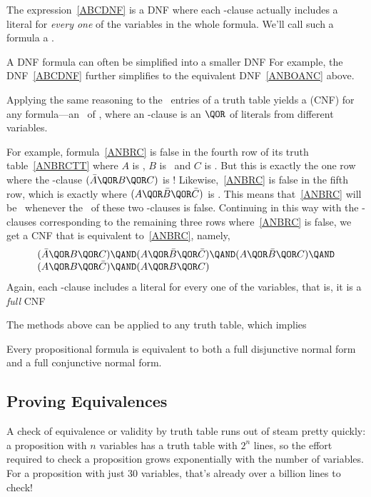 The expression~\eqref{ABCDNF} is a DNF where each \QAND-clause
actually includes a literal for \emph{every one} of the variables in
the whole formula.  We'll call such a formula a . 

A DNF formula can often be simplified into a smaller DNF For example,
the DNF~\eqref{ABCDNF} further simplifies to the equivalent
DNF~\eqref{ANBOANC} above.

Applying the same reasoning to the \false\ entries of a truth table
yields a  (CNF)
 for any formula---an
\QAND\ of , where an \QOR-clause is an $\QOR$ of
literals from different variables.

For example, formula~\eqref{ANBRC} is false in the fourth row of its
truth table~\eqref{ANBRCTT} where $A$ is \true, $B$ is \false\ and $C$
is \false.  But this is exactly the one row where the \QOR-clause
$(\bar{A} \QOR B \QOR C)$ is \false!  Likewise,~\eqref{ANBRC} is
false in the fifth row, which is exactly where $(A \QOR \bar{B} \QOR
\bar{C})$ is \false.  This means that~\eqref{ANBRC} will be
\false\ whenever the \QAND\ of these two \QOR-clauses is false.
\iffalse $(\bar{A} \QOR B \QOR C) \QAND (A \QOR \bar{B} \QOR \bar{C})$
is \false.  \fi Continuing in this way with the \QOR-clauses
corresponding to the remaining three rows where~\eqref{ANBRC} is
false, we get a CNF that is equivalent to~\eqref{ANBRC}, namely,
\[\begin{array}{l}
(\bar{A} \QOR B \QOR C)  \QAND (A \QOR \bar{B} \QOR \bar{C}) 
        \QAND (A \QOR \bar{B} \QOR C)  \QAND \\
(A \QOR B \QOR \bar{C}) \QAND (A \QOR B \QOR C)
\end{array}\]
Again, each \QOR-clause includes a literal for every one of the
variables, that is, it is a \emph{full} CNF

The methods above can be applied to any truth table, which implies
\begin{theorem}
Every propositional formula is equivalent to both a full disjunctive
normal form and a full conjunctive normal form.
\end{theorem}

\subsection{Proving Equivalences}\label{propositional_equivalences_sec}
A check of equivalence
or validity by truth table runs out of steam
pretty quickly: a proposition with $n$ variables has a truth table
with $2^n$ lines, so the effort required to check a proposition
grows exponentially with the number of variables.  For a
proposition with just 30 variables, that's already over a billion
lines to check!

